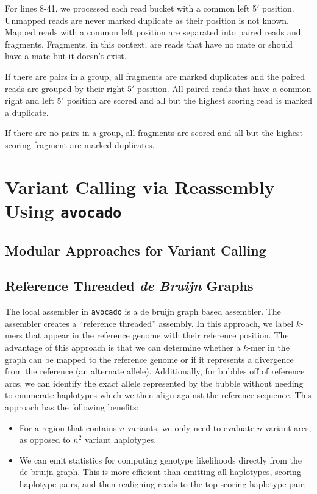 \documentclass[masters]{ucbthesis}
\begin{document}
For lines 8-41, we processed each read bucket with a common left 5$'$ position. Unmapped
reads are never marked duplicate as their position is not known. Mapped reads with a common
left position are separated into paired reads and fragments. Fragments, in this context,
are reads that have no mate or should have a mate but it doesn't exist.

If there are pairs in a group, all fragments are marked duplicates and the paired reads are grouped
by their right 5$'$ position. All paired reads that have a common right and left 5$'$
position are scored and all but the highest scoring read is marked a duplicate.

If there are no pairs in a group, all fragments are scored and all but the highest scoring fragment
are marked duplicates.

\chapter{Variant Calling via Reassembly Using \texttt{avocado}}

\section{Modular Approaches for Variant Calling}
\label{sec:variant-calling}

\section{Reference Threaded \emph{de Bruijn} Graphs}
\label{sec:reference-threaded}

The local assembler in \texttt{avocado} is a de bruijn graph based assembler. The assembler creates
a ``reference threaded'' assembly. In this approach, we label $k$-mers that appear in the
reference genome with their reference position. The advantage of this approach is that we can
determine whether a $k$-mer in the graph can be mapped to the reference genome or if it
represents a divergence from the reference (an alternate allele). Additionally, for bubbles
off of reference arcs, we can identify the exact allele represented by the bubble without
needing to enumerate haplotypes which we then align against the reference sequence. This
approach has the following benefits:

\begin{itemize}
\item For a region that contains $n$ variants, we only need to evaluate $n$ variant arcs, as
opposed to $n^2$ variant haplotypes.
\item We can emit statistics for computing genotype likelihoods directly from the de bruijn
graph. This is more efficient than emitting all haplotypes, scoring haplotype pairs, and
then realigning reads to the top scoring haplotype pair.
\end{itemize}
\end{document}
